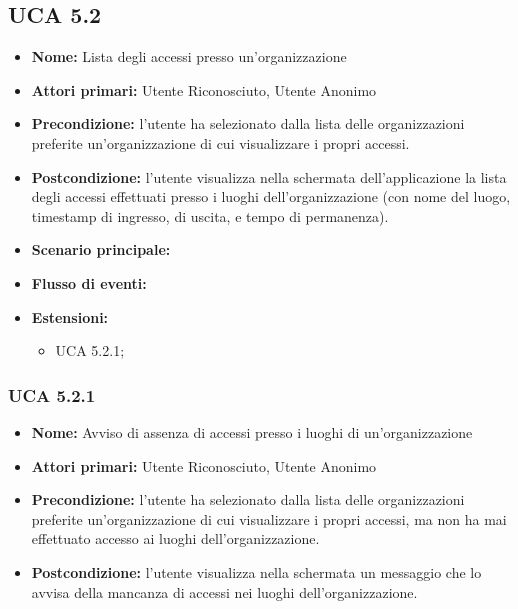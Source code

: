 \subsection{UCA 5.2}
\begin{itemize}
    \item \textbf{Nome:} Lista degli accessi presso un'organizzazione
    \item \textbf{Attori primari:} Utente Riconosciuto, Utente Anonimo
    \item \textbf{Precondizione:} l'utente ha selezionato dalla lista delle organizzazioni preferite un'organizzazione di cui visualizzare i propri accessi.
    \item \textbf{Postcondizione:} l’utente visualizza nella schermata dell’applicazione la lista degli accessi effettuati presso i luoghi dell’organizzazione (con nome del luogo, timestamp di ingresso, di uscita, e tempo di permanenza).
    \item \textbf{Scenario principale:} %
    \item \textbf{Flusso di eventi:} %
    \item \textbf{Estensioni:}
    \begin{itemize}
        \item UCA 5.2.1;
    \end{itemize}
\end{itemize}

\subsubsection{UCA 5.2.1}
\begin{itemize}
    \item \textbf{Nome:} Avviso di assenza di accessi presso i luoghi di un’organizzazione
    \item \textbf{Attori primari:} Utente Riconosciuto, Utente Anonimo
    \item \textbf{Precondizione:} l'utente ha selezionato dalla lista delle organizzazioni preferite un'organizzazione di cui visualizzare i propri accessi, ma non ha mai effettuato accesso ai luoghi dell'organizzazione.
    \item \textbf{Postcondizione:} l'utente visualizza nella schermata un messaggio che lo avvisa della mancanza di accessi nei luoghi dell'organizzazione.
\end{itemize}

